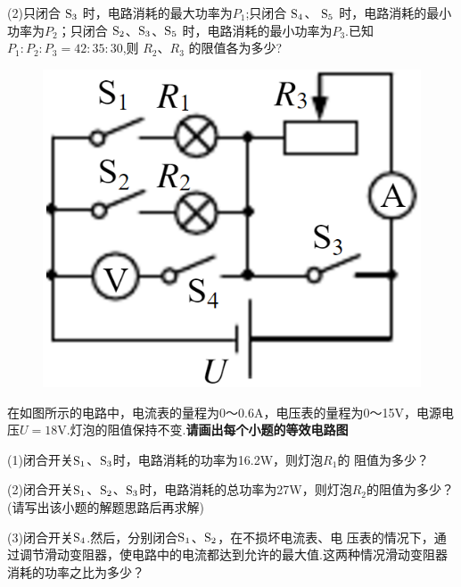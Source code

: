 \documentclass[11pt,a4paper]{article}
\newcommand{\nianfen}[1]{\hspace{-2em}{(#1\textbf{·}\textit{青岛})}}
\begin{document}
{	(2)只闭合 $\rm S_3 $ 时，电路消耗的最大功率为$ P_1 $;只闭合 $\rm S_4$、 $\rm S_5 $ 时，电路消耗的最小功率为$ P_2 $；只闭合 $\rm S_2 $、$\rm S_3 $、$\rm S_5 $ 时，电路消耗的最小功率为$ P_3 $.已知 $ P_1:P_2:P_3=42:35:30 $,则 $ R_2 $、$ R_3 $ 的限值各为多少?
	\clearpage
	
	\begin{figure}
		\includegraphics[width=\linewidth]{2012}
	\end{figure}
	
	\nianfen{2012}在如图所示的电路中，电流表的量程为0～0.6A，电压表的量程为0～15V，电源电
	压$ U=18 $V.灯泡的阻值保持不变.\textbf{请画出每个小题的等效电路图}
	
	(1)闭合开关$\rm S_1 $、$\rm S_3 $时，电路消耗的功率为16.2W，则灯泡$ R_1 $的
	阻值为多少？ 
	
	(2)闭合开关$\rm S_1 $、$\rm S_2 $、$\rm S_3 $时，电路消耗的总功率为27W，则灯泡$ R_2 $的阻值为多少？(请写出该小题的解题思路后再求解) 
	
	(3)闭合开关$\rm S_4 $.然后，分别闭合$\rm S_1 $、$\rm S_2 $，在不损坏电流表、电
	压表的情况下，通过调节滑动变阻器，使电路中的电流都达到允许的最大值.这两种情况滑动变阻器消耗的功率之比为多少？
	\clearpage
	
}
\end{document}

